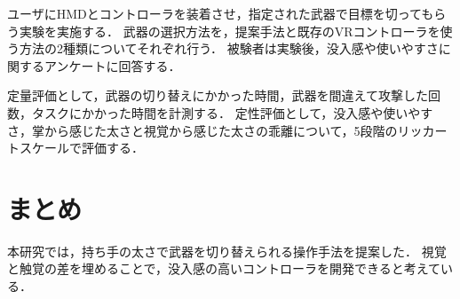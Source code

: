 \documentclass[uplatex]{jsarticle}
\begin{document}
ユーザにHMDとコントローラを装着させ，指定された武器で目標を切ってもらう実験を実施する．
武器の選択方法を，提案手法と既存のVRコントローラを使う方法の2種類についてそれぞれ行う．
被験者は実験後，没入感や使いやすさに関するアンケートに回答する．

定量評価として，武器の切り替えにかかった時間，武器を間違えて攻撃した回数，タスクにかかった時間を計測する．
定性評価として，没入感や使いやすさ，掌から感じた太さと視覚から感じた太さの乖離について，5段階のリッカートスケールで評価する．

\section{まとめ}

本研究では，持ち手の太さで武器を切り替えられる操作手法を提案した．
視覚と触覚の差を埋めることで，没入感の高いコントローラを開発できると考えている．





\end{document}
